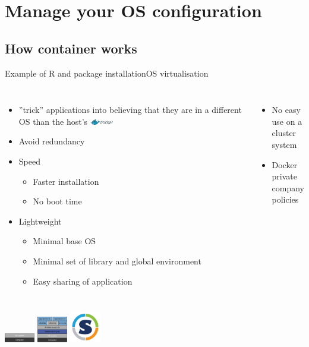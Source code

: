 \section{Manage your OS configuration}
\subsection{How container works}

\begin{frame}{Example of R and package installation}{OS virtualisation}
\begin{columns}
\begin{itemize}
	\item ”trick” applications into believing that they are in a different OS than the host’s \includegraphics[width=0.1\textwidth]{images/docker_logo2.png}
	\item Avoid redundancy
	\item Speed
	\begin{itemize}
		\item Faster installation
		\item No boot time
	\end{itemize}
	\item Lightweight
	\begin{itemize}
		\item Minimal base OS
		\item Minimal set of library and global environment 
		\item Easy sharing of application 
	\end{itemize}	
\end{itemize}
\begin{itemize}
	\item No easy use on a cluster system
	\item Docker private company policies
\end{itemize}
\end{columns}
\includegraphics[width=0.1\textwidth]{images/docker_env_1.pdf} 
\includegraphics[width=0.1\textwidth]{images/docker_env_2.pdf} 
\includegraphics[width=0.1\textwidth]{images/singularity_logo.pdf}

\end{frame}
